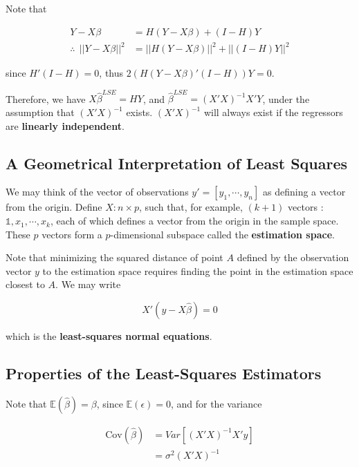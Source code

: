 \documentclass[12pt]{article}
\begin{document}
Note that 

$$
\begin{aligned}
Y - X\beta&= H (Y - X\beta) + (I - H) Y \\[10pt]
\therefore \ \  || Y - X\beta ||^2 &= ||H (Y-X\beta)||^2 + ||(I-H)Y||^2
\end{aligned}
$$

since $H' (I-H) = 0$, thus $2(H(Y-X\beta)' (I-H))Y = 0$.

Therefore, we have $X \hat{\beta}^{LSE} = H Y$, and $\hat{\beta}^{LSE} = (X'X)^{-1} X' Y$, under the assumption that $(X'X)^{-1}$ exists. $(X'X)^{-1}$ will always exist if the regressors are \textbf{linearly independent}. 



\subsection{A Geometrical Interpretation of Least Squares}

We may think of the vector of observations $y' = [y_1, \cdots, y_n] $ as defining a vector from the origin. Define $X : n \times p$, such that, for example, $(k+1)$ vectors : $\mathds{1}, x_1, \cdots, x_k$, each of which defines a vector from the origin in the sample space. These $p$ vectors form a $p$-dimensional subspace called the \textbf{estimation space}. 

Note that minimizing the squared distance of point $A$ defined by the observation vector $y$ to the estimation space requires finding the point in the estimation space closest to $A$. We may write

$$
X' (y - X \hat{\beta}) = 0
$$

which is the \textbf{least-squares normal equations}.


\subsection{Properties of the Least-Squares Estimators}

Note that $\mathbb{E} (\hat{\beta} ) = \beta$, since $\mathbb{E} (\epsilon) = 0$, and for the variance

$$
\begin{aligned}
\mathrm{Cov}(\hat{\beta}) &= Var[ (X'X)^{-1} X' y]   \\[8pt]
&= \sigma^2 (X'X)^{-1}
\end{aligned}
$$
\end{document}
